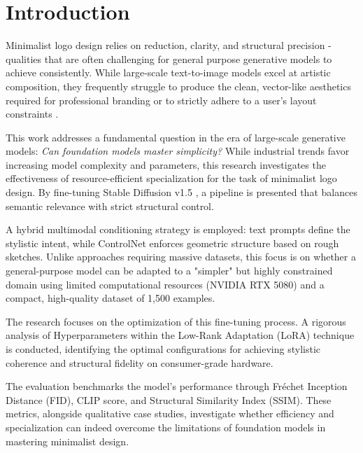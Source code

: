 \section{Introduction}\label{sec:introduction}
Minimalist logo design relies on reduction, clarity, and structural precision - qualities that are often challenging for general purpose generative models to achieve consistently. While large-scale text-to-image models excel at artistic composition, they frequently struggle to produce the clean, vector-like aesthetics required for professional branding or to strictly adhere to a user's layout constraints \cite[1]{bertao2023blind}.

This work addresses a fundamental question in the era of large-scale generative models: \textit{Can foundation models master simplicity?} While industrial trends favor increasing model complexity and parameters, this research investigates the effectiveness of resource-efficient specialization for the task of minimalist logo design. By fine-tuning Stable Diffusion v1.5 \cite{HuggingFace_StableDiffusionv15_ModelCard}, a pipeline is presented that balances semantic relevance with strict structural control.

A hybrid multimodal conditioning strategy is employed: text prompts define the stylistic intent, while ControlNet \cite{ZHANG2023} enforces geometric structure based on rough sketches. Unlike approaches requiring massive datasets, this focus is on whether a general-purpose model can be adapted to a "simpler" but highly constrained domain using limited computational resources (NVIDIA RTX 5080) and a compact, high-quality dataset of 1,500 examples.

The research focuses on the optimization of this fine-tuning process. A rigorous analysis of Hyperparameters within the Low-Rank Adaptation (LoRA) technique is conducted, identifying the optimal configurations for achieving stylistic coherence and structural fidelity on consumer-grade hardware.

The evaluation benchmarks the model's performance through Fréchet Inception Distance (FID), CLIP score, and Structural Similarity Index (SSIM). These metrics, alongside qualitative case studies, investigate whether efficiency and specialization can indeed overcome the limitations of foundation models in mastering minimalist design.

